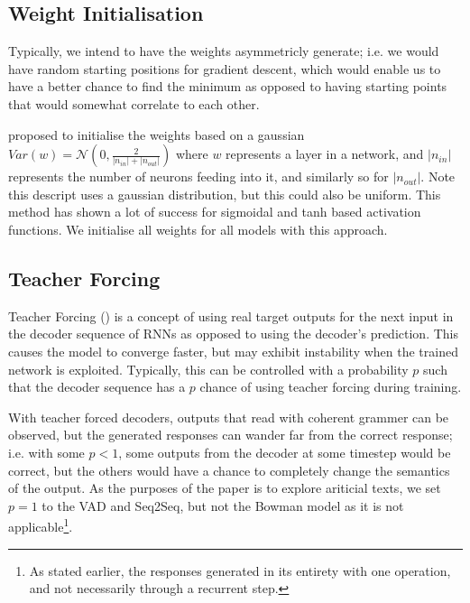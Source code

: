 \documentclass[12pt,twoside]{report}
\begin{document}

\subsection*{Weight Initialisation}

Typically, we intend to have the weights asymmetricly generate; i.e. we would have random starting positions for gradient descent, which would enable us to have a better chance to find the minimum as opposed to having starting points that would somewhat correlate to each other.

\cite{glorot_understanding_2010} proposed to initialise the weights based on a gaussian $Var(w)=\mathcal{N}(0,\frac{2}{|n_{in}| + |n_{out}| })$ where $w$ represents a layer in a network, and $|n_{in}|$ represents the number of neurons feeding into it, and similarly so for $|n_{out}|$. Note this descript uses a gaussian distribution, but this could also be uniform. This method has shown a lot of success for sigmoidal and tanh based activation functions. We initialise all weights for all models with this approach.

\subsection*{Teacher Forcing}

Teacher Forcing (\cite{williams_learning_1989}) is a concept of using real target outputs for the next input in the decoder sequence of RNNs as opposed to using the decoder's prediction. This causes the model to converge faster, but may exhibit instability when the trained network is exploited. Typically, this can be controlled with a probability $p$ such that the decoder sequence has a $p$ chance of using teacher forcing during training.

With teacher forced decoders, outputs that read with coherent grammer can be observed, but the generated responses can wander far from the correct response; i.e. with some $p<1$, some outputs from the decoder at some timestep would be correct, but the others would have a chance to completely change the semantics of the output. As the purposes of the paper is to explore ariticial texts, we set $p=1$ to the VAD and Seq2Seq, but not the Bowman model as it is not applicable\footnote{As stated earlier, the responses generated in its entirety with one operation, and not necessarily through a recurrent step.}.
\end{document}
